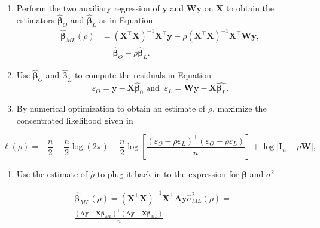 \documentclass[
  letterpaper,
]{scrbook}
\providecommand{\tightlist}{%
  \setlength{\itemsep}{0pt}\setlength{\parskip}{0pt}}\usepackage{longtable,booktabs,array}
\begin{document}
\begin{enumerate}
\def\labelenumi{\arabic{enumi})}
\item
  Perform the two auxiliary regression of \(\boldsymbol{\mathbf{y}}\)
  and \(\boldsymbol{\mathbf{W}}\boldsymbol{\mathbf{y}}\) on
  \(\boldsymbol{\mathbf{X}}\) to obtain the estimators
  \(\widehat{\boldsymbol{\mathbf{\beta}}}_O\) and
  \(\widehat{\boldsymbol{\mathbf{\beta}}}_L\) as in Equation \[
  \begin{split}
  \widehat{\boldsymbol{\mathbf{\beta}}}_{ML}(\rho) &= \left(\boldsymbol{\mathbf{X}}^\intercal\boldsymbol{\mathbf{X}}\right)^{-1}\boldsymbol{\mathbf{X}}^\intercal\boldsymbol{\mathbf{y}} - \rho\left(\boldsymbol{\mathbf{X}}^\intercal\boldsymbol{\mathbf{X}}\right)^{-1}\boldsymbol{\mathbf{X}}^\intercal\boldsymbol{\mathbf{W}}\boldsymbol{\mathbf{y}}, \\
  &= \widehat{\boldsymbol{\mathbf{\beta}}}_O -\rho \widehat{\boldsymbol{\mathbf{\beta}}}_L.
  \end{split}
  \]
\item
  Use \(\widehat{\boldsymbol{\mathbf{\beta}}}_O\) and
  \(\widehat{\boldsymbol{\mathbf{\beta}}}_L\) to compute the residuals
  in Equation \[
  \varepsilon_O = \boldsymbol{\mathbf{y}} - \boldsymbol{\mathbf{X}}\widehat{\boldsymbol{\mathbf{\beta}}}_0\,\,\mbox{and} \;\; \varepsilon_L = \boldsymbol{\mathbf{W}}\boldsymbol{\mathbf{y}} - \boldsymbol{\mathbf{X}}\widehat{\boldsymbol{\mathbf{\beta}}_L}.
  \]
\item
  By numerical optimization to obtain an estimate of \(\rho\), maximize
  the concentrated likelihood given in
\end{enumerate}

\[
\ell(\rho)=-\frac{n}{2}-\frac{n}{2}\log(2\pi) - \frac{n}{2}\log\left[\frac{\left(\varepsilon_O - \rho\varepsilon_L\right)^\intercal\left(\varepsilon_O - \rho\varepsilon_L\right)}{n}\right] + \log\left|\boldsymbol{\mathbf{I}}_n - \rho\boldsymbol{\mathbf{W}}\right|,
\]

\begin{enumerate}
\def\labelenumi{\arabic{enumi})}
\setcounter{enumi}{3}
\tightlist
\item
  Use the estimate of \(\widehat{\rho}\) to plug it back in to the
  expression for \(\boldsymbol{\mathbf{\beta}}\) and \(\sigma^2\)
\end{enumerate}

\[
\begin{split}
\widehat{\boldsymbol{\mathbf{\beta}}}_{ML}(\rho) = \left(\boldsymbol{\mathbf{X}}^\intercal\boldsymbol{\mathbf{X}}\right)^{-1}\boldsymbol{\mathbf{X}}^\intercal\boldsymbol{\mathbf{A}}\boldsymbol{\mathbf{y}}
\widehat{\sigma}^2_{ML}(\rho) =\\ 
\frac{\left(\boldsymbol{\mathbf{A}}\boldsymbol{\mathbf{y}} - \boldsymbol{\mathbf{X}}\boldsymbol{\mathbf{\beta}}_{ML}\right)^\intercal\left(\boldsymbol{\mathbf{A}}\boldsymbol{\mathbf{y}} - \boldsymbol{\mathbf{X}}\boldsymbol{\mathbf{\beta}}_{ML}\right)}{n}
\end{split}
\]
\end{document}
